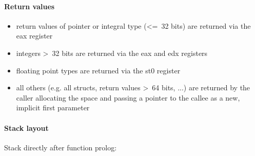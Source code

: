 \pagebreak

\paragraph{Return values}

\begin{itemize}
\item return values of pointer or integral type (\textless=\ 32 bits) are returned via the eax register
\item integers \textgreater\ 32 bits are returned via the eax and edx registers
\item floating point types are returned via the st0 register
\item all others (e.g. all structs, return values \textgreater\ 64 bits, ...) are returned by the caller allocating the space and
passing a pointer to the callee as a new, implicit first parameter
\end{itemize}



\paragraph{Stack layout}

Stack directly after function prolog:\\

